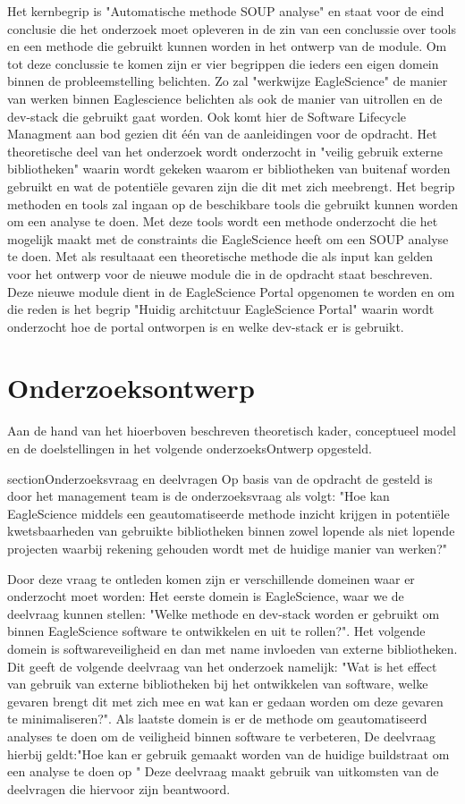 Het kernbegrip is "Automatische methode SOUP analyse" en staat voor de eind conclusie die het onderzoek moet opleveren in de zin van een conclussie over tools en een methode die gebruikt kunnen worden in het ontwerp van de module. Om tot deze conclussie te komen zijn er vier begrippen die ieders een eigen domein binnen de probleemstelling belichten. Zo zal "werkwijze EagleScience" de manier van werken binnen Eaglescience belichten als ook de manier van uitrollen en de dev-stack die gebruikt gaat worden. Ook komt hier de Software Lifecycle Managment aan bod gezien dit één van de aanleidingen voor de opdracht. Het theoretische deel van het onderzoek wordt onderzocht in "veilig gebruik externe bibliotheken" waarin wordt gekeken waarom er bibliotheken van buitenaf worden gebruikt en wat de potentiële gevaren zijn die dit met zich meebrengt. Het begrip methoden en tools zal ingaan op de beschikbare tools die gebruikt kunnen worden om een analyse te doen. Met deze tools wordt een methode onderzocht die het mogelijk maakt met de constraints die EagleScience heeft om een SOUP analyse te doen. Met als resultaaat een theoretische methode die als input kan gelden voor het ontwerp voor de nieuwe module die in de opdracht staat beschreven. Deze nieuwe module dient in de EagleScience Portal opgenomen te worden en om die reden is het begrip "Huidig architctuur EagleScience Portal" waarin wordt onderzocht hoe de portal ontworpen is en welke dev-stack er is gebruikt.

\section{Onderzoeksontwerp}\label{sec:OP_onderzoeksontwerp}
Aan de hand van het hioerboven beschreven theoretisch kader, conceptueel model en de doelstellingen in het volgende onderzoeksOntwerp opgesteld.

section{Onderzoeksvraag en deelvragen}
Op basis van de opdracht de gesteld is door het management team is de onderzoeksvraag als volgt: "Hoe kan EagleScience middels een geautomatiseerde methode inzicht krijgen in potentiële kwetsbaarheden van gebruikte bibliotheken binnen zowel lopende als niet lopende projecten waarbij rekening gehouden wordt met de huidige manier van werken?"

Door deze vraag te ontleden komen zijn er verschillende domeinen waar er onderzocht moet worden:
Het eerste domein is EagleScience, waar we de deelvraag kunnen stellen: "Welke methode en dev-stack worden er gebruikt om binnen EagleScience software te ontwikkelen en uit te rollen?". Het volgende domein is softwareveiligheid en dan met name invloeden van externe bibliotheken. Dit geeft de volgende deelvraag van het onderzoek namelijk: "Wat is het effect van gebruik van externe bibliotheken bij het ontwikkelen van software, welke gevaren brengt dit met zich mee en wat kan er gedaan worden om deze gevaren te minimaliseren?". Als laatste domein is er de methode om geautomatiseerd analyses te doen om de veiligheid binnen software te verbeteren, De deelvraag hierbij geldt:"Hoe kan er gebruik gemaakt worden van de huidige buildstraat om een analyse te doen op " Deze deelvraag maakt gebruik van uitkomsten van de deelvragen die hiervoor zijn beantwoord.


